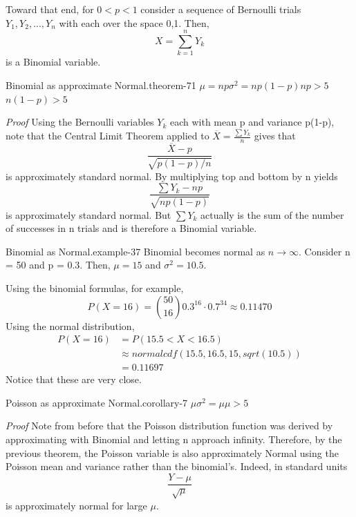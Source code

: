 \documentclass[10pt,]{book}
\makeatletter
\renewcommand*{\proofname}{Proof}
\renewenvironment{proof}[1][\proofname]{\par
  \pushQED{\qed}%
  \normalfont \topsep6\p@\@plus6\p@\relax
  \trivlist
  \item\relax
    {\itshape
    #1\@addpunct{.}}\hspace\labelsep\ignorespaces
}{%
  \popQED\endtrivlist\@endpefalse
}
\numberwithin{equation}{section}
\newcommand{\lt}{<}
\newcommand{\gt}{>}
\makeatother
\begin{document}
\par
\hypertarget{p-1074}{}%
Toward that end, for \(0 \lt p \lt 1\) consider a sequence of Bernoulli trials \(Y_1, Y_2, ..., Y_n\) with each over the space {0,1}. Then,%
\begin{equation*}
X = \sum_{k=1}^n Y_k
\end{equation*}
is a Binomial variable.%
\begin{theorem}{Binomial as approximate Normal.}{}{theorem-71}%
\(\mu = np\)\(\sigma^2 = np(1-p)\)\(np \gt 5\)\(n(1-p) \gt 5\)\end{theorem}
\begin{proof}\hypertarget{proof-68}{}
\hypertarget{p-1075}{}%
Using the Bernoulli variables \(Y_k\) each with mean p and variance p(1-p), note that the Central Limit Theorem applied to \(\overline{X} = \frac{\sum Y_k}{n}\) gives that%
\begin{equation*}
\frac{\overline{X}-p}{\sqrt{p(1-p)/n}}
\end{equation*}
is approximately standard normal. By multiplying top and bottom by n yields%
\begin{equation*}
\frac{\sum Y_k - np}{\sqrt{np(1-p)}}
\end{equation*}
is approximately standard normal. But \(\sum Y_k\) actually is the sum of the number of successes in n trials and is therefore a Binomial variable.%
\end{proof}
\begin{example}{Binomial as Normal.}{example-37}%
\hypertarget{p-1076}{}%
Binomial becomes normal as \(n \rightarrow \infty\).  Consider n = 50 and p = 0.3.  Then, \(\mu = 15\) and \(\sigma^2 = 10.5\).%
\par
\hypertarget{p-1077}{}%
Using the binomial formulas, for example,%
\begin{equation*}
P( X = 16 ) = \binom{50}{16} 0.3^{16} \cdot 0.7^{34} \approx 0.11470
\end{equation*}
Using the normal distribution,%
\begin{align*}
P( X = 16 ) & = P( 15.5 \lt X \lt 16.5) \\
& \approx normalcdf(15.5,16.5,15,sqrt(10.5)) \\
& = 0.11697
\end{align*}
Notice that these are very close.%
\end{example}
\begin{corollary}{Poisson as approximate Normal.}{}{corollary-7}%
\(\mu\)\(\sigma^2 = \mu\)\(\mu \gt 5\)\end{corollary}
\begin{proof}\hypertarget{proof-69}{}
\hypertarget{p-1078}{}%
Note from before that the Poisson distribution function was derived by approximating with Binomial and letting n approach infinity. Therefore, by the previous theorem, the Poisson variable is also approximately Normal using the Poisson mean and variance rather than the binomial's. Indeed, in standard units%
\begin{equation*}
\frac{Y - \mu}{\sqrt{\mu}}
\end{equation*}
is approximately normal for large \(\mu\).%
\end{proof}
\end{document}
